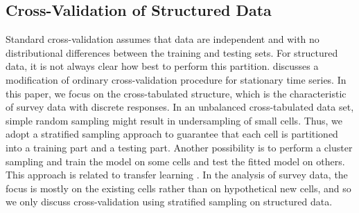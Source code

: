 \documentclass[sii]{ipart}
\begin{document}

\subsection{Cross-Validation of Structured Data}
Standard cross-validation assumes that data are independent and with no
distributional differences between the training and testing sets. For structured
data, it is not always clear how best to perform this partition. \citet{burman1994cross} discusses a modification of ordinary
cross-validation procedure for stationary time series. In this paper, we focus on
the cross-tabulated structure, which is the characteristic of survey
data with discrete responses. In an unbalanced cross-tabulated data set, simple random sampling might
result in undersampling of small cells. Thus, we adopt a stratified sampling
approach to guarantee that each cell is partitioned into a training part and a
testing part. Another possibility is to perform a cluster sampling and train the model
on some cells and test the fitted model on others. This approach is related
to transfer learning \citep{pan2010survey}. In the analysis of survey data, the
focus is mostly on the existing cells rather than on hypothetical new cells, and
so we only discuss cross-validation using stratified sampling on
structured data.

\end{document}
